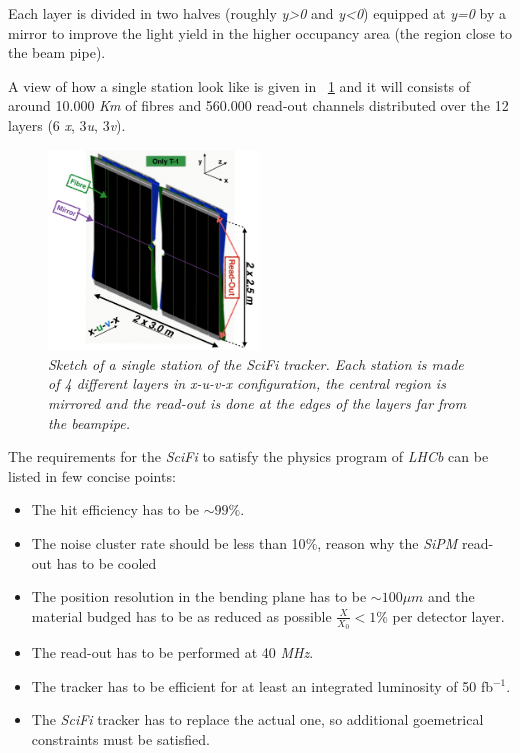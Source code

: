 \documentclass[paper=a4, fontsize=10pt]{scrartcl}
\numberwithin{equation}{section}		%
\numberwithin{figure}{section}			%
\numberwithin{table}{section}				%
\begin{document}
Each layer is divided in two halves (roughly \textit{y>0} and \textit{y<0}) equipped at \textit{y=0} by a mirror to improve the light yield in the higher occupancy area (the region close to the beam pipe).

A view of how a single station look like is given in ~\ref{Fig:SciFi} and it will consists of around 10.000 \textit{Km} of fibres and 560.000 read-out channels distributed over the 12 layers (6 \textit{x}, 3\textit{u}, 3\textit{v}).
\begin{figure}[h]
  \begin{center}
    \includegraphics[width=0.5\textwidth]{Images/ModuleSciFi.png} 
  \caption[Caption for track type]{\emph{Sketch of a single station of the SciFi tracker. Each station is made of 4 different layers in x-u-v-x configuration, the central region is mirrored and the read-out is done at the edges of the layers far from the beampipe.}}\label{Fig:SciFi}
  \end{center}
\end{figure}

The requirements for the \textit{SciFi} to satisfy the physics program of \textit{LHCb} can be listed in few concise points: 
\begin{itemize} 
\item{The hit efficiency has to be $\sim 99 \%$.}
\item{The noise cluster rate should be less than 10$\%$, reason why the \textit{SiPM} read-out has to be cooled}\item{The position resolution in the bending plane has to be $\sim 100 \mu m$ and the material budged has to be as reduced as possible $\frac{X}{X_{0}}<1 \%$ per detector layer.}
\item{The read-out has to be performed at 40 \textit{MHz}.}
\item{The tracker has to be efficient for at least an integrated luminosity of 50 fb$^{-1}$.}
\item{The \textit{SciFi} tracker has to replace the actual one, so additional goemetrical constraints must be satisfied.}
\end{itemize}
\end{document}

